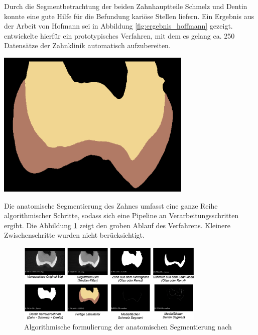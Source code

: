 \begin{minipage}{0.45\textwidth}
	Durch die Segmentbetrachtung der beiden Zahnhauptteile Schmelz und Dentin konnte
	\citet[S.~41]{hoffmann2020} eine gute Hilfe für die Befundung kariöse Stellen
	liefern. Ein Ergebnis aus der Arbeit von Hofmann sei in Abbildung \ref{fig:ergebnis_hoffmann}
	gezeigt. \citet[S.~53]{hoffmann2020} entwickelte hierfür ein prototypisches Verfahren,
	mit dem es gelang ca. 250 Datensätze der Zahnklinik automatisch aufzubereiten.
\end{minipage}
\hfill
\begin{minipage}{0.45\textwidth}
	\centering
	\includegraphics[width=0.7\textwidth]{img/ergebnis_hoffmann_2.jpg}
	\label{fig:ergebnis_hoffmann}
\end{minipage}

Die anatomische Segmentierung des Zahnes umfasst eine ganze Reihe
algorithmischer Schritte, sodass sich eine Pipeline an Verarbeitungsschritten ergibt.
Die Abbildung \ref{fig:anatomische_segmentierung} zeigt den groben Ablauf des
Verfahrens. Kleinere Zwischenschritte wurden nicht berücksichtigt.

\begin{figure}[h]
	\centering
	\includegraphics[width=0.8\textwidth]{img/anatomischeSegmentierung.png}
	\caption{Algorithmische formulierung der anatomischen Segmentierung nach
	\citet{hoffmann2020}}
	\label{fig:anatomische_segmentierung}
\end{figure}

